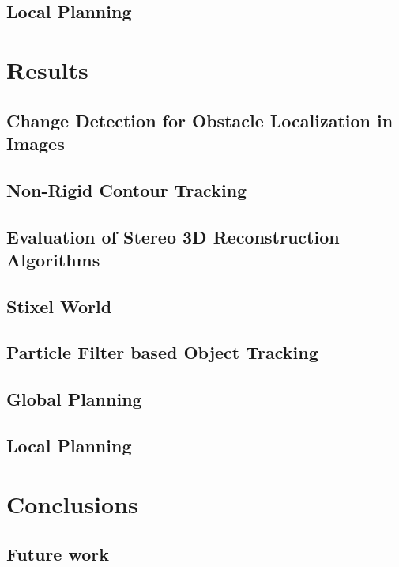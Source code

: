 \documentclass{beamer}
\begin{document}
  \subsection{Local Planning}
  
\section{Results}
  \subsection{Change Detection for Obstacle Localization in Images}
  \subsection{Non-Rigid Contour Tracking}
  \subsection{Evaluation of Stereo 3D Reconstruction Algorithms}
  \subsection{Stixel World}
  \subsection{Particle Filter based Object Tracking}
  \subsection{Global Planning}
  \subsection{Local Planning}
  
\section{Conclusions}
  \subsection{Future work}
\end{document}
